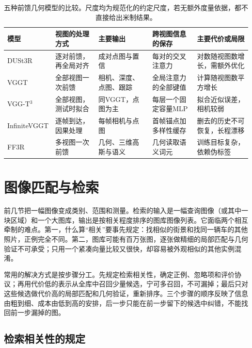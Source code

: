 \begin{table}[tbp]
 \centering
 \small
 \begin{tabularx}{\linewidth}{@{}lXXXX@{}}
 \toprule
 模型 & 视图的处理方式 & 主要输出 & 跨视图信息的保存 & 主要代价或局限\\
 \midrule
 DUSt3R & 逐对前馈，再全局对齐 & 成对点图与置信 & 每对的交叉注意力 & 对数随视图数增长，需额外优化\\
 VGGT & 全部视图一次前馈 & 相机、深度、点图、跟踪 & 全局注意力的全部键值 & 计算随视图数平方增长\\
 VGG-T$^3$ & 全部视图，测试时拟合 & 同VGGT，点图为主 & 每层一个固定容量MLP & 拟合近似误差，相机较弱\\
 InfiniteVGGT & 逐帧到达，因果处理 & 每帧相机与点图 & 首帧锚点加多样性缓存 & 删去的历史不可恢复，长程漂移\\
 FF3R & 多视图一次前馈 & 几何、三维高斯与语义 & 几何读取语义词元 & 训练目标复杂，依赖伪标签\\
 \bottomrule
 \end{tabularx}
 \caption{五种前馈几何模型的比较。尺度均为规范化的约定尺度，若无额外度量依据，都不直接给出米制结果。}
 \label{tab:vision-recognition-geometry-compare}
\end{table}

\section{图像匹配与检索}
\label{sec:vision-recognition-retrieval}

前几节把一幅图像变成类别、范围和测量。检索的输入是一幅查询图像（或其中一块区域）和一个大图库，输出是按相关程度排序的图库图像列表。它面临两个相互牵制的难点。第一，什么算“相关”要事先规定：找相似的街景和找同一辆车的其他照片，正例完全不同。第二，图库可能有百万张图，逐张做精细的局部匹配与几何验证不可承受；只用一个紧凑向量比较又很快，却容易被外观相似的其他实例混淆。

常用的解决方式是按步骤分工。先规定检索相关性，确定正例、忽略项和评价协议；再用代价低的表示从全库中召回少量候选，宁可多召回，不可漏掉；最后只对这些候选做代价高的局部匹配和几何验证，重新排序。三个步骤的顺序反映了信息由粗到细、成本由低到高的安排，后一步只能在前一步留下的候选中纠错，不能找回前一步漏掉的图。

\subsection{检索相关性的规定}
\label{sec:vision-recognition-relevance}

